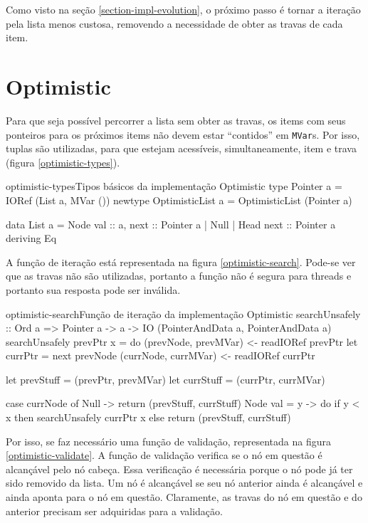 \documentclass[a4paper,12pt,oldfontcommands]{abntex2}
\begin{document}
Como visto na seção \ref{section-impl-evolution}, o próximo passo é tornar a iteração pela lista menos custosa, removendo a necessidade de obter as travas de cada item.

\section{Optimistic}\label{section-optimistic-implementation}

Para que seja possível percorrer a lista sem obter as travas, os items com seus ponteiros para os próximos items não devem estar ``contidos'' em \texttt{MVar}s. Por isso, tuplas são utilizadas, para que estejam acessíveis, simultaneamente, item e trava (figura \ref{optimistic-types}).

\begin{code}{optimistic-types}{Tipos básicos da implementação Optimistic}
type Pointer a = IORef (List a, MVar ())
newtype OptimisticList a = OptimisticList (Pointer a)

data List a = Node { val :: a, next :: Pointer a }
    | Null
    | Head { next :: Pointer a }
    deriving Eq
\end{code}

A função de iteração está representada na figura \ref{optimistic-search}. Pode-se ver que as travas não são utilizadas, portanto a função não é segura para threads e portanto sua resposta pode ser inválida.

\begin{code}{optimistic-search}{Função de iteração da implementação Optimistic}
searchUnsafely :: Ord a => Pointer a -> a -> IO (PointerAndData a, PointerAndData a)
searchUnsafely prevPtr x = do
    (prevNode, prevMVar) <- readIORef prevPtr
    let currPtr = next prevNode
    (currNode, currMVar) <- readIORef currPtr

    let prevStuff = (prevPtr, prevMVar)
    let currStuff = (currPtr, currMVar)

    case currNode of
        Null -> return (prevStuff, currStuff)
        Node { val = y } -> do
            if y < x then searchUnsafely currPtr x
            else return (prevStuff, currStuff)
\end{code}

Por isso, se faz necessário uma função de validação, representada na figura \ref{optimistic-validate}. A função de validação verifica se o nó em questão é alcançável pelo nó cabeça. Essa verificação é necessária porque o nó pode já ter sido removido da lista. Um nó é alcançável se seu nó anterior ainda é alcançável e ainda aponta para o nó em questão. Claramente, as travas do nó em questão e do anterior precisam ser adquiridas para a validação.
\end{document}
